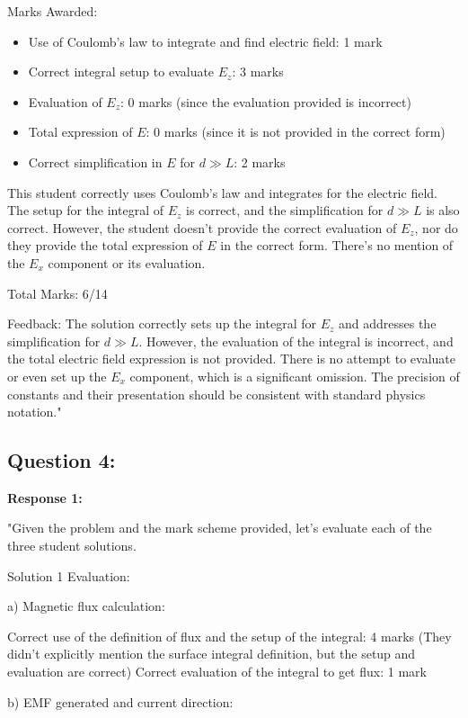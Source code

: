 \documentclass[a4paper,11pt]{article}
\begin{document}
Marks Awarded:
\begin{itemize}
  \item Use of Coulomb's law to integrate and find electric field: 1 mark
  \item Correct integral setup to evaluate \( E_z \): 3 marks
  \item Evaluation of \( E_z \): 0 marks (since the evaluation provided is incorrect)
  \item Total expression of \( E \): 0 marks (since it is not provided in the correct form)
  \item Correct simplification in \( E \) for \( d \gg L \): 2 marks
\end{itemize}

This student correctly uses Coulomb's law and integrates for the electric field. The setup for the integral of \( E_z \) is correct, and the simplification for \( d \gg L \) is also correct. However, the student doesn't provide the correct evaluation of \( E_z \), nor do they provide the total expression of \( E \) in the correct form. There's no mention of the \( E_x \) component or its evaluation.

Total Marks: 6/14

Feedback:
The solution correctly sets up the integral for \( E_z \) and addresses the simplification for \( d \gg L \). However, the evaluation of the integral is incorrect, and the total electric field expression is not provided. There is no attempt to evaluate or even set up the \( E_x \) component, which is a significant omission. The precision of constants and their presentation should be consistent with standard physics notation."

\subsection*{Question 4:}

\textbf{Response 1:}

"Given the problem and the mark scheme provided, let's evaluate each of the three student solutions.

Solution 1 Evaluation:

a) Magnetic flux calculation:

Correct use of the definition of flux and the setup of the integral: 4 marks (They didn't explicitly mention the surface integral definition, but the setup and evaluation are correct)
Correct evaluation of the integral to get flux: 1 mark

b) EMF generated and current direction:
\end{document}
